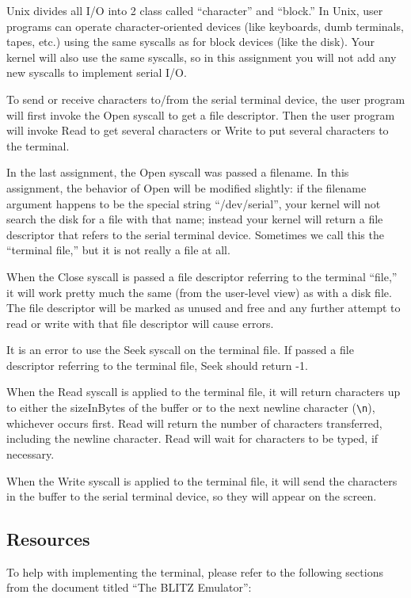 \documentclass[11pt]{article}
\begin{document}
Unix divides all I/O into 2 class called ``character'' and ``block.''  In
Unix, user programs can operate character-oriented devices (like
keyboards, dumb terminals, tapes, etc.) using the same syscalls as for
block devices (like the disk).  Your kernel will also use the same
syscalls, so in this assignment you will not add any new syscalls
to implement serial I/O.

To send or receive characters to/from the serial terminal device, the
user program will first invoke the Open syscall to get a file
descriptor.  Then the user program will invoke Read to get several
characters or Write to put several characters to the terminal.

In the last assignment, the Open syscall was passed a filename.  In
this assignment, the behavior of Open will be modified slightly: if
the filename argument happens to be the special string ``/dev/serial'',
your kernel will not search the disk for a file with that name;
instead your kernel will return a file descriptor that refers to the
serial terminal device.  Sometimes we call this the ``terminal file,''
but it is not really a file at all.

When the Close syscall is passed a file descriptor referring to the
terminal ``file,'' it will work pretty much the same (from the
user-level view) as with a disk file.  The file descriptor will be
marked as unused and free and any further attempt to read or write
with that file descriptor will cause errors.

It is an error to use the Seek syscall on the terminal file.  If
passed a file descriptor referring to the terminal file, Seek should
return -1.

When the Read syscall is applied to the terminal file, it will return
characters up to either the sizeInBytes of the buffer or to the next
newline character (\verb+\n+), whichever occurs first.  Read will return the
number of characters transferred, including the newline character.  Read
will wait for characters to be typed, if necessary.

When the Write syscall is applied to the terminal file, it will send
the characters in the buffer to the serial terminal device, so they
will appear on the screen.

\subsection{Resources}

To help with implementing the terminal, please refer to the following
sections from the document titled ``The BLITZ Emulator'':
\end{document}
